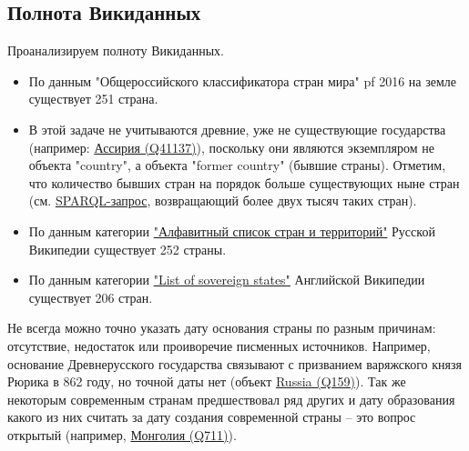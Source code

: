 \subsection{Полнота Викиданных}
Проанализируем полноту Викиданных.
\begin{itemize}
    \item По данным "Общероссийского классификатора стран мира" pf 2016 на земле существует 251 страна.
    \item В этой задаче не учитываются древние, уже не существующие государства (например: \href{https://www.wikidata.org/wiki/Q41137}{Ассирия (Q41137)}), поскольку они являются экземпляром не объекта "country", а объекта "former country" (бывшие страны). Отметим, что количество бывших стран на порядок больше существующих ныне стран (см. \href{https://query.wikidata.org/#SELECT%20%3Fitem%20%3Flabel%20%3F_image%20WHERE%20%7B%0A%20%20%3Fitem%20wdt%3AP31%20wd%3AQ3024240.%0A%20%20SERVICE%20wikibase%3Alabel%20%7B%0A%20%20%20%20bd%3AserviceParam%20wikibase%3Alanguage%20%22en%22%20.%20%0A%20%20%20%20%3Fitem%20rdfs%3Alabel%20%3Flabel%0A%20%20%7D%0A%20%20%0AOPTIONAL%20%7B%20%3Fitem%20wdt%3AP18%20%3F_image.%20%7D%0A%7D%0A}{SPARQL-запрос}, возвращающий более двух тысяч таких стран).

    \item По данным категории \href{https://ru.wikipedia.org/wiki/%D0%90%D0%BB%D1%84%D0%B0%D0%B2%D0%B8%D1%82%D0%BD%D1%8B%D0%B9_%D1%81%D0%BF%D0%B8%D1%81%D0%BE%D0%BA_%D1%81%D1%82%D1%80%D0%B0%D0%BD_%D0%B8_%D1%82%D0%B5%D1%80%D1%80%D0%B8%D1%82%D0%BE%D1%80%D0%B8%D0%B9}{"Алфавитный список стран и территорий"} Русской Википедии существует  252  страны.

    \item По данным категории \href{https://www.wikipedia.org/wiki/en:List_of_sovereign_states}{"List of sovereign states"} Английской Википедии существует 206 стран.
    \end{itemize}

Не всегда можно точно указать дату основания страны по разным причинам: отсутствие, недостаток или проиворечие писменных источников. Например, основание Древнерусского государства связывают с призванием варяжского князя Рюрика в 862 году, но точной даты нет (объект \href{https://www.wikidata.org/wiki/Q159} {Russia (Q159)}). Так же некоторым современным странам предшествовал ряд других и дату образования какого из них считать за дату создания современной страны -- это вопрос открытый (например, \href{https://www.wikidata.org/wiki/Q711}{Монголия (Q711)}).


